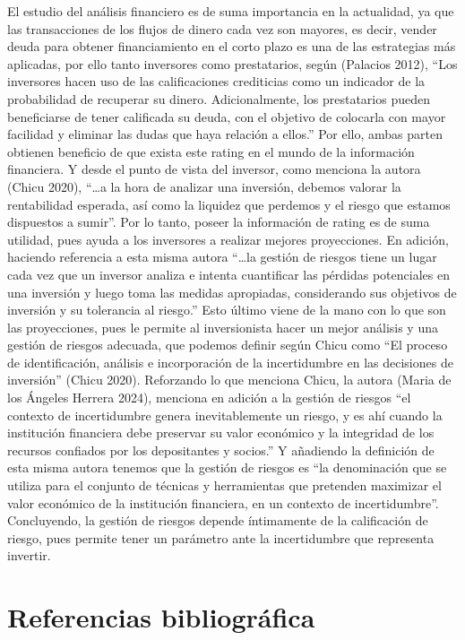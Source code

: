 \documentclass[
  letterpaper,
  DIV=11,
  numbers=noendperiod]{scrreprt}
\begin{document}
El estudio del análisis financiero es de suma importancia en la
actualidad, ya que las transacciones de los flujos de dinero cada vez
son mayores, es decir, vender deuda para obtener financiamiento en el
corto plazo es una de las estrategias más aplicadas, por ello tanto
inversores como prestatarios, según (Palacios 2012), ``Los inversores
hacen uso de las calificaciones crediticias como un indicador de la
probabilidad de recuperar su dinero. Adicionalmente, los prestatarios
pueden beneficiarse de tener calificada su deuda, con el objetivo de
colocarla con mayor facilidad y eliminar las dudas que haya relación a
ellos.'' Por ello, ambas parten obtienen beneficio de que exista este
rating en el mundo de la información financiera. Y desde el punto de
vista del inversor, como menciona la autora (Chicu 2020), ``\ldots a la
hora de analizar una inversión, debemos valorar la rentabilidad
esperada, así como la liquidez que perdemos y el riesgo que estamos
dispuestos a sumir''. Por lo tanto, poseer la información de rating es
de suma utilidad, pues ayuda a los inversores a realizar mejores
proyecciones. En adición, haciendo referencia a esta misma autora
``\ldots la gestión de riesgos tiene un lugar cada vez que un inversor
analiza e intenta cuantificar las pérdidas potenciales en una inversión
y luego toma las medidas apropiadas, considerando sus objetivos de
inversión y su tolerancia al riesgo.'' Esto último viene de la mano con
lo que son las proyecciones, pues le permite al inversionista hacer un
mejor análisis y una gestión de riesgos adecuada, que podemos definir
según Chicu como ``El proceso de identificación, análisis e
incorporación de la incertidumbre en las decisiones de inversión''
(Chicu 2020). Reforzando lo que menciona Chicu, la autora (Maria de los
Ángeles Herrera 2024), menciona en adición a la gestión de riesgos ``el
contexto de incertidumbre genera inevitablemente un riesgo, y es ahí
cuando la institución financiera debe preservar su valor económico y la
integridad de los recursos confiados por los depositantes y socios.'' Y
añadiendo la definición de esta misma autora tenemos que la gestión de
riesgos es ``la denominación que se utiliza para el conjunto de técnicas
y herramientas que pretenden maximizar el valor económico de la
institución financiera, en un contexto de incertidumbre''. Concluyendo,
la gestión de riesgos depende íntimamente de la calificación de riesgo,
pues permite tener un parámetro ante la incertidumbre que representa
invertir.

\section{Referencias bibliográfica}\label{referencias-bibliogruxe1fica}
\end{document}
